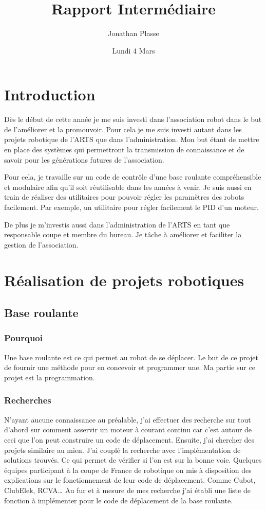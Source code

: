 \documentclass[12pt,a4paper]{report}
\title{Rapport Intermédiaire}
\author{Jonathan Plasse}
\date{Lundi 4 Mars}
\begin{document}
\maketitle

\chapter*{Introduction}
  Dès le début de cette année je me suis investi dans l'association robot dans le but de l'améliorer et la promouvoir.
  Pour cela je me suis investi autant dans les projets robotique de l'ARTS que dans l'administration.
  Mon but étant de mettre en place des systèmes qui permettront la transmission de connaissance et de savoir pour les générations futures de l'association.

  Pour cela, je travaille sur un code de contr\^ole d'une base roulante compréhensible et modulaire afin qu'il soit réutilisable dans les années à venir.
  Je suis aussi en train de réaliser des utilitaires pour pouvoir régler les paramètres des robots facilement. Par exemple, un utilitaire pour régler facilement le PID d'un moteur.

  De plus je m'investis aussi dans l'administration de l'ARTS en tant que responsable coupe et membre du bureau. Je t\^ache à améliorer et faciliter la gestion de l'association.

\chapter{Réalisation de projets robotiques}


  \section{Base roulante}
    \subsection{Pourquoi}
      Une base roulante est ce qui permet au robot de se déplacer. Le but de ce projet de fournir une méthode pour en concevoir et programmer une. Ma partie sur ce projet est la programmation.

    \subsection{Recherches}
      N'ayant aucune connaissance au préalable, j'ai effectuer des recherche sur tout d'abord sur comment asservir un moteur à courant continu car c'est autour de ceci que l'on peut construire un code de déplacement. Ensuite, j'ai chercher des projets similaire au mien.
      J'ai couplé la recherche avec l'implémentation de solutions trouvés. Ce qui permet de vérifier si l'on est sur la bonne voie.
      Quelques équipes participant à la coupe de France de robotique on mis à disposition des explications sur le fonctionnement de leur code de déplacement. Comme Cubot, ClubElek, RCVA…
      Au fur et à mesure de mes recherche j'ai établi une liste de fonction à implémenter pour le code de déplacement de la base roulante.
\end{document}
